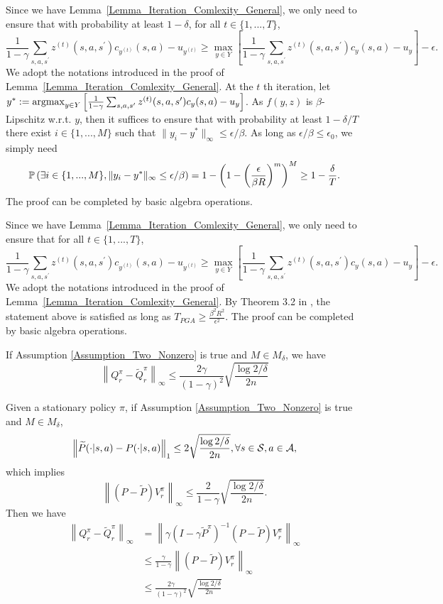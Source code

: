 Since we have Lemma~\ref{Lemma_Iteration_Comlexity_General}, we only need to ensure that with probability at least $1-\delta$, 
for all $t\in\{1,...,T\}$, 
    $$
    \frac{1}{1-\gamma}\sum_{s, a,s^\prime}z^{(t)}(s,a,s^\prime)c_{y^{(t)}}(s,a)- u_{y^{(t)}}\geq \max_{y\in Y}\left[\frac{1}{1-\gamma}\sum_{s, a,s^\prime}z^{(t)}(s,a,s^\prime)c_{y}(s,a)- u_{y}\right]-\epsilon.
    $$
We adopt the notations introduced in the proof of Lemma~\ref{Lemma_Iteration_Comlexity_General}.
At the $t$ th iteration, let $y^*:=\operatorname*{argmax}_{y\in Y}\left[\frac{1}{1-\gamma}\sum_{s, a,s^\prime}z^{(t)}(s,a,s^\prime)c_{y}(s,a)- u_{y}\right]$.
As $f(y,z)$ is $\beta$-Lipschitz w.r.t. $y$, then it suffices to ensure that with probability at least $1-\delta/T$ there exist $i\in\{1,...,M\}$ such that $\|y_i-y^*\|_\infty\leq \epsilon/\beta$.
As long as $\epsilon/\beta\leq \epsilon_0$, we simply need
$$
{\mathbb P}\left(\exists i\in\{1,...,M\}, \|y_i-y^*\|_\infty\leq \epsilon/\beta\right)=1-\left(1-\left(\frac{\epsilon}{\beta R}\right)^m\right)^M\geq 1-\frac{\delta}{T}.
$$
The proof can be completed by basic algebra operations.
\endproof

Since we have Lemma~\ref{Lemma_Iteration_Comlexity_General}, we only need to ensure that for all $t\in\{1,...,T\}$, 
    $$
    \frac{1}{1-\gamma}\sum_{s, a,s^\prime}z^{(t)}(s,a,s^\prime)c_{y^{(t)}}(s,a)- u_{y^{(t)}}\geq \max_{y\in Y}\left[\frac{1}{1-\gamma}\sum_{s, a,s^\prime}z^{(t)}(s,a,s^\prime)c_{y}(s,a)- u_{y}\right]-\epsilon.
    $$
We adopt the notations introduced in the proof of Lemma~\ref{Lemma_Iteration_Comlexity_General}.
By Theorem 3.2 in \cite{bubeck2015convex}, the statement above is satisfied as long as $T_{PGA}\geq \frac{\beta^2R^2}{\epsilon^2}$.
The proof can be completed by basic algebra operations.
\endproof

\begin{lemma}\label{Lemma_Crude_Bound}
If Assumption \ref{Assumption_Two_Nonzero} is true and $M\in M_\delta$, we have 
$$
\left\|Q_r^\pi-\widetilde Q_r^\pi\right\|_\infty\leq \frac{2\gamma}{(1-\gamma)^2}\sqrt{\frac{\log 2/\delta}{2n}}
$$
\end{lemma}
Given a stationary policy $\pi$, if Assumption \ref{Assumption_Two_Nonzero} is true and $M\in M_\delta$, 
$$\left\|\widetilde P(\cdot|s,a) -P(\cdot|s,a)\right\|_1 \leq 2\sqrt{\frac{\log 2/\delta}{2n}},\forall s\in {\mathcal{S}},a\in {\mathcal{A}},
$$
which implies
$$
\left\|(P-\widetilde P)V_r^\pi\right\|_\infty\leq \frac{2}{1-\gamma}\sqrt{\frac{\log 2/\delta}{2n}}.
$$
Then we have
$$\begin{aligned}
    \left\|Q_r^\pi-\widetilde Q_r^\pi\right\|_\infty&= \left\|\gamma\left(I-\gamma \widetilde{P}^{\pi}\right)^{-1}(P-\widetilde{P}) V_r^{\pi}\right\|_\infty\\
    &\leq \frac{\gamma}{1-\gamma}\left\|(P-\widetilde P)V_r^\pi\right\|_\infty\\
    &\leq \frac{2\gamma}{(1-\gamma)^2}\sqrt{\frac{\log 2/\delta}{2n}}
\end{aligned}
$$
\endproof

